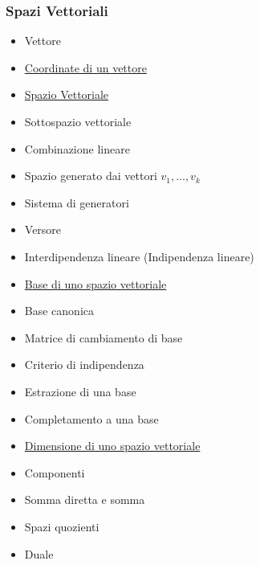 \subsubsection{Spazi Vettoriali}
\begin{itemize}
 \item Vettore
 \item \href{CoordinateVettore.pdf}{Coordinate di un vettore}
 \item \href{SpazioVettoriale.pdf}{Spazio Vettoriale}
 \item Sottospazio vettoriale
 \item Combinazione lineare
 \item Spazio generato dai vettori $v_1, ..., v_k$
 \item Sistema di generatori
 \item Versore
 \item Interdipendenza lineare (Indipendenza lineare)
 \item \href{Base.pdf}{Base di uno spazio vettoriale}
 \item Base canonica
 \item Matrice di cambiamento di base
 \item Criterio di indipendenza
 \item Estrazione di una base
 \item Completamento a una base
 \item \href{Dimensione.pdf}{Dimensione di uno spazio vettoriale}
 \item Componenti
 \item Somma diretta e somma 
 \item Spazi quozienti
 \item Duale
\end{itemize}

